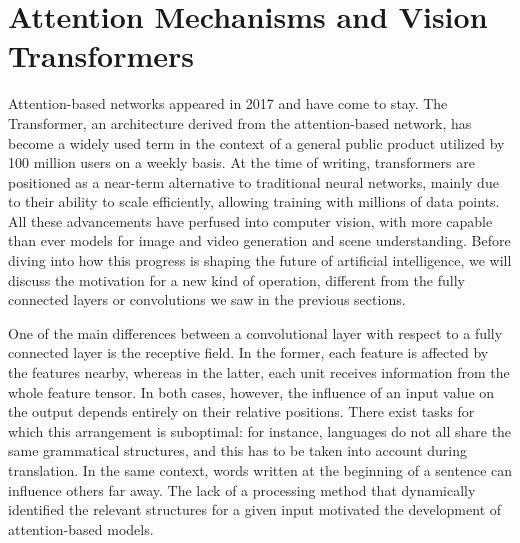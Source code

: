 

\section{Attention Mechanisms and Vision Transformers}
\label{sec:attention}
Attention-based networks appeared in 2017 and have come to stay. The Transformer, an architecture derived from the attention-based network, has become a widely used term in the context of a general public product utilized by 100 million users on a weekly basis. At the time of writing, transformers are positioned as a near-term alternative to traditional neural networks, mainly due to their ability to scale efficiently, allowing training with millions of data points. All these advancements have perfused into computer vision, with more capable than ever models for image and video generation and scene understanding. Before diving into how this progress is shaping the future of artificial intelligence, we will discuss the motivation for a new kind of operation, different from the fully connected layers or convolutions we saw in the previous sections.

One of the main differences between a convolutional layer with respect to a fully connected layer is the receptive field. In the former, each feature is affected by the features nearby, whereas in the latter, each unit receives information from the whole feature tensor. In both cases, however, the influence of an input value on the output depends entirely on their relative positions. There exist tasks for which this arrangement is suboptimal: for instance, languages do not all share the same grammatical structures, and this has to be taken into account during translation. In the same context, words written at the beginning of a sentence can influence others far away. The lack of a processing method that dynamically identified the relevant structures for a given input motivated the development of attention-based models.

